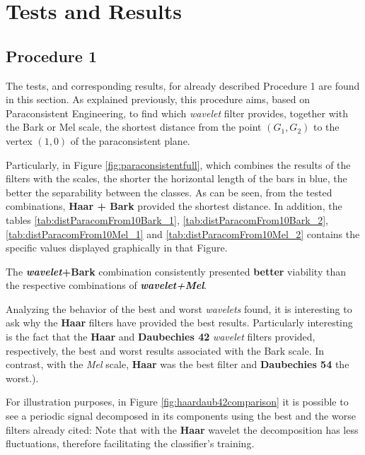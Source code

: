 \section{Tests and Results}
\label{sec:testsResults}
	\subsection{Procedure 1}
		\label{sec:testsResults:subsec:Experimento01}
		\par The tests, and corresponding results, for already described Procedure 1   are found in this section. As explained previously, this procedure aims, based on Paraconsistent Engineering, to find which \textit{wavelet} filter provides, together with the Bark or Mel scale, the shortest distance from the point $(G_1,G_2)$ to the vertex $(1,0)$ of the paraconsistent plane.\\
		
		\par Particularly, in Figure \ref{fig:paraconsistentfull}, which combines the results of the filters with the scales, the shorter the horizontal length of the bars in blue, the better the separability between the classes. As can be seen, from the tested combinations, \textbf{Haar + Bark} provided the shortest distance. In addition, the tables \ref{tab:distParacomFrom10Bark_1}, \ref{tab:distParacomFrom10Bark_2}, \ref{tab:distParacomFrom10Mel_1} and \ref{tab:distParacomFrom10Mel_2} contains the specific values displayed graphically in that Figure.\\
		
		\par The \textbf{\textit{wavelet}+Bark} combination consistently presented \textbf{better} viability than the respective combinations of \textbf{\textit{wavelet+Mel}}.\\
		
		\par Analyzing the behavior of the best and worst \textit{wavelets} found, it is interesting to ask why the \textbf{Haar} filters have provided the best results. Particularly interesting is the fact that the \textbf{Haar} and \textbf{Daubechies 42} \textit{wavelet} filters provided, respectively, the best and worst results associated with the Bark scale. In contrast, with the \textit{Mel} scale, \textbf{Haar} was the best filter and \textbf{Daubechies 54} the worst.).\\
		
		\par For illustration purposes, in Figure \ref{fig:haardaub42comparison} it is possible to see a periodic signal decomposed in its components using the best and the worse filters already cited: Note that with the \textbf{Haar} wavelet the decomposition has less fluctuations, therefore facilitating the classifier's training.
		
